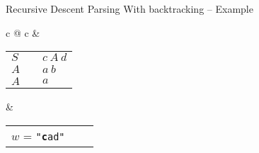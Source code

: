 \documentclass{beamer}
\begin{document}
\begin{frame}{Recursive Descent Parsing}
{With backtracking -- Example}

\begin{center}
\begin{tabular}{c @{\hspace{1cm}} c}
 &  \\

\begin{minipage}{0.4\textwidth}

\begin{tabular}{l @{} c @{} l}
$S$ & {\myprod} & $c\ A\ d$ \\
$A$ & {\myprod} & $a\ b$    \\
$A$ & {\myprod} & $a$
\end{tabular}

\end{minipage}
&
\begin{minipage}{0.4\textwidth}
\begin{tabular}{l @{} c @{} l}

$w$ = \texttt{"{\color{Red}\textbf{c}}ad"}
\end{tabular}
\end{minipage}
\end{tabular}
\end{center}


\begin{center}
\end{center}

\end{frame}
\end{document}
